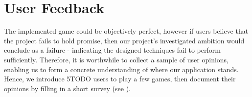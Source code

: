 \documentclass{standalone}
\begin{document}
	\section{User Feedback} \label{sec:userFeedback}
		The implemented game could be objectively perfect, however if users believe that the project fails to hold promise, then our project's investigated ambition would conclude as a failure - indicating the designed techniques fail to perform sufficiently. Therefore, it is worthwhile to collect a sample of user opinions, enabling us to form a concrete understanding of where our application stands. Hence, we introduce 5TODO users to play a few games, then document their opinions by filling in a short survey (see ).
\end{document}

